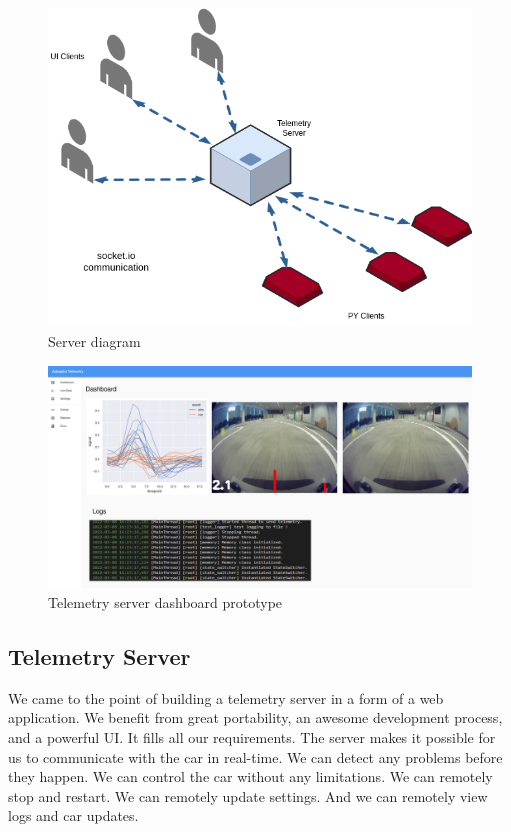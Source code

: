 \documentclass[12pt]{article}
\begin{document}
\begin{figure}[b!]
    \includegraphics[width=\textwidth]{../../docs/diagram.png}
    \caption{Server diagram}
    \label{fig:diagram}
\end{figure}

\begin{figure}[b!]
    \centering
    \includegraphics[height=.8\textwidth, angle=90]{../../docs/telemetry.png}
    \caption{Telemetry server dashboard prototype}
    \label{fig:telemetry}
\end{figure}

\newpage


\subsection{Telemetry Server}
We came to the point of building a telemetry server in a form of a web application. We benefit from great portability, an awesome development process, and a powerful UI. It fills all our requirements. The server makes it possible for us to communicate with the car in real-time. We can detect any problems before they happen. We can control the car without any limitations. We can remotely stop and restart. We can remotely update settings. And we can remotely view logs and car updates. \\ 
\end{document}
